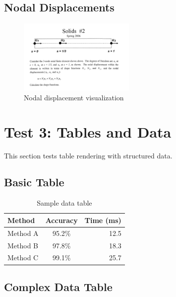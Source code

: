 \documentclass[12pt]{article}
\begin{document}
\subsection{Nodal Displacements}

\begin{figure}[ht]
    \centering
    \includegraphics[width=0.5\textwidth]{examples/Nodal Displacements.png}
    \caption{Nodal displacement visualization}
    \label{fig:nodal}
\end{figure}

\newpage

\section{Test 3: Tables and Data}

This section tests table rendering with structured data.

\subsection{Basic Table}

\begin{table}[ht]
    \centering
    \caption{Sample data table}
    \label{tab:sample}
    \begin{tabular}{lcr}
        \toprule
        \textbf{Method} & \textbf{Accuracy} & \textbf{Time (ms)} \\
        \midrule
        Method A & 95.2\% & 12.5 \\
        Method B & 97.8\% & 18.3 \\
        Method C & 99.1\% & 25.7 \\
        \bottomrule
    \end{tabular}
\end{table}

\subsection{Complex Data Table}
\end{document}
